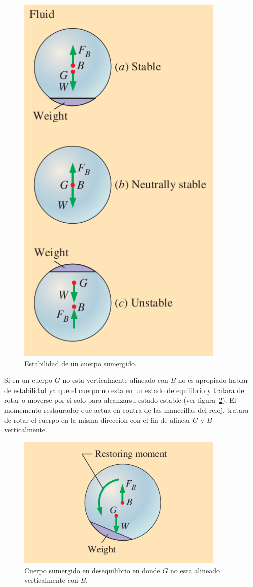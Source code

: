 \documentclass[10pt, oneside]{article}
\begin{document}
\begin{figure}[h]
\centering
\includegraphics[width=10cm]{rota}
\caption{Estabilidad de un cuerpo sumergido.}
\label{rota}
\end{figure}

Si en un cuerpo $G$ no esta verticalmente alineado con $B$ no es apropiado hablar de estabilidad ya que el cuerpo no esta en un estado de equilibrio y tratara de rotar o moverse por si solo para alcanzarsu estado estable (ver figura~\ref{rota2}). El momemento restaurador que actua en contra de las manecillas del reloj, tratara de rotar el cuerpo en la misma direccion con el fin de alinear $G$ y $B$ verticalmente.
\begin{figure}[h]
\centering
\includegraphics[width=10cm]{rota2}
\caption{Cuerpo sumergido en desequilibrio en donde $G$ no esta alineado verticalmente con $B$.}
\label{rota2}
\end{figure}
\end{document}
